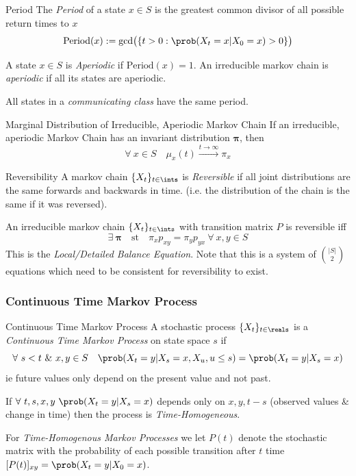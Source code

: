 \documentclass[11pt,a4paper]{article}
\begin{document}
  \begin{definition}{Period}
    The \textit{Period} of a state $x\in S$ is the greatest common divisor of all possible return times to $x$
    \[ \text{Period}(x):=\text{gcd}\big(\{t>0:\prob(X_t=x|X_0=x)>0\}\big) \]
    \par A state $x\in S$ is \textit{Aperiodic} if $\text{Period}(x)=1$. An irreducible markov chain is \textit{aperiodic} if all its states are aperiodic.
    \par All states in a \textit{communicating class} have the same period.
  \end{definition}

  \begin{proposition}{Marginal Distribution of Irreducible, Aperiodic Markov Chain}
    If an irreducible, aperiodic Markov Chain has an invariant distribution $\pmb\pi$, then
    \[ \forall\ x\in S\quad\mu_x(t)\overset{t\to\infty}{\longrightarrow}\pi_x \]
  \end{proposition}

  \begin{definition}{Reversibility}
    A markov chain $\{X_t\}_{t\in\ints}$ is \textit{Reversible} if all joint distributions are the same forwards and backwards in time. (i.e. the distribution of the chain is the same if it was reversed).
    \par An irreducible markov chain $\{X_t\}_{t\in\ints}$ with transition matrix $P$ is reversible iff
    \[\exists\ \pmb\pi\quad\text{st}\quad\pi_xp_{xy}=\pi_yp_{yx}\ \forall\ x,y\in S\]
    This is the \textit{Local/Detailed Balance Equation}. Note that this is a system of ${|S|\choose2}$ equations which need to be consistent for reversibility to exist.
  \end{definition}

\subsubsection{Continuous Time Markov Process}

  \begin{definition}{Continuous Time Markov Process}
    A stochastic process $\{X_t\}_{t\in\reals}$ is a \textit{Continuous Time Markov Process} on state space $s$ if
    \[ \forall\ s<t\ \&\ x,y\in S\quad\prob(X_t=y|X_s=x,X_u,u\leq s)=\prob(X_t=y|X_s=x) \]
    ie future values only depend on the present value and not past.
    \par If $\forall\ t,s,x,y\ \prob(X_t=y|X_s=x)$ depends only on $x,y,t-s$ (observed values \& change in time) then the process is \textit{Time-Homogeneous}.
    \par For \textit{Time-Homogenous Markov Processes} we let $P(t)$ denote the stochastic matrix with the probability of each possible transition after $t$ time $[P(t)]_{xy}=\prob(X_t=y|X_0=x)$.
  \end{definition}
\end{document}
